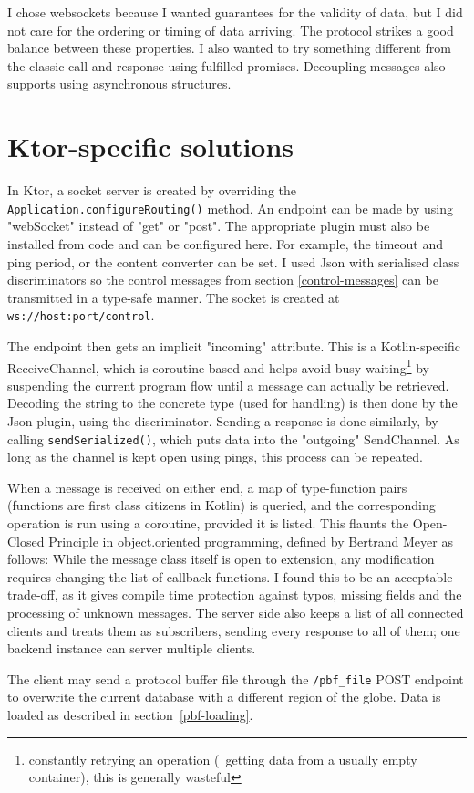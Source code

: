 I chose websockets because I wanted guarantees for the validity of data, but I did not care for the ordering or timing of data arriving. The protocol strikes a good balance between these properties. I also wanted to try something different from the classic call-and-response using fulfilled promises. Decoupling messages also supports using asynchronous structures.

\section{Ktor-specific solutions}

In Ktor, a socket server is created by overriding the \verb|Application.configureRouting()| method. An endpoint can be made by using "webSocket" instead of "get" or "post". The appropriate plugin must also be installed from code and can be configured here. For example, the timeout and ping period, or the content converter can be set. I used Json with serialised class discriminators so the control messages from section \ref{control-messages} can be transmitted in a type-safe manner. The socket is created at \verb|ws://host:port/control|.

The endpoint then gets an implicit "incoming" attribute. This is a Kotlin-specific ReceiveChannel, which is coroutine-based and helps avoid busy waiting\footnote{constantly retrying an operation (\eg~getting data from a usually empty container), this is generally wasteful} by suspending the current program flow until a message can actually be retrieved. Decoding the string to the concrete type (used for handling) is then done by the Json plugin, using the discriminator. Sending a response is done similarly, by calling \verb|sendSerialized()|, which puts data into the "outgoing" SendChannel. As long as the channel is kept open using pings, this process can be repeated.

When a message is received on either end, a map of type-function pairs (functions are first class citizens in Kotlin) is queried, and the corresponding operation is run using a coroutine, provided it is listed. This flaunts the Open-Closed Principle in object.oriented programming, defined by Bertrand Meyer\cite{OOSC-OCP} as follows:  While the message class itself is open to extension, any modification requires changing the list of callback functions. I found this to be an acceptable trade-off, as it gives compile time protection against typos, missing fields and the processing of unknown messages. The server side also keeps a list of all connected clients and treats them as subscribers, sending every response to all of them; one backend instance can server multiple clients.

The client may send a protocol buffer file through the \verb|/pbf_file| POST endpoint to overwrite the current database with a different region of the globe. Data is loaded as described in section~\ref{pbf-loading}.